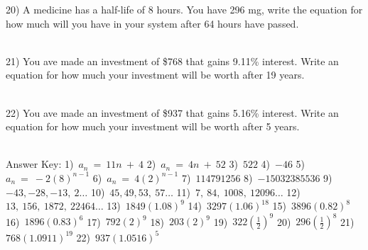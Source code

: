 \documentclass[12pt]{article}
\begin{document}
20) A medicine has a half-life of 8 hours. You have 296 mg, write the equation for how much will you have in your system after 64 hours have passed. \\ \\
 

\hrulefill









21) You ave made an investment of \$768 that gains 9.11\% interest. Write an equation for how much your investment will be worth after 19 years. \\ \\
 

\hrulefill






22) You ave made an investment of \$937 that gains 5.16\% interest. Write an equation for how much your investment will be worth after 5 years. \\ \\
 

\hrulefill


Answer Key: 1)~$a_n~=~11n~+~4$\hspace{.5 in} 2)~$a_n~=~4n~+~52$\hspace{.5 in} 3)~$522$\hspace{.5 in} 4)~$-46$\hspace{.5 in} 5)~$a_n~=~-2(8)^{n-1}$\hspace{.5 in} 6)~$a_n~=~4(2)^{n-1}$\hspace{.5 in} 7)~$114791256$\hspace{.5 in} 8)~$-15032385536$\hspace{.5 in} 9)~$-43, -28, -13,~2\ldots $\hspace{.5 in} 10)~$45, 49, 53,~57\ldots $\hspace{.5 in} 11)~$7,~84,~1008,~12096\ldots $\hspace{.5 in} 12)~$13,~156,~1872,~22464\ldots $\hspace{.5 in} 13)~$1849(1.08)^{9}$\hspace{.5 in} 14)~$3297(1.06)^{18}$\hspace{.5 in} 15)~$3896(0.82)^{8}$\hspace{.5 in} 16)~$1896(0.83)^{6}$\hspace{.5 in} 17)~$792(2)^{9}$\hspace{.5 in} 18)~$203(2)^{9}$\hspace{.5 in} 19)~$322(\frac{1}{2})^{9}$\hspace{.5 in} 20)~$296(\frac{1}{2})^{8}$\hspace{.5 in} 21)~$768(1.0911)^{19}$\hspace{.5 in} 22)~$937(1.0516)^{5}$\hspace{.5 in} 
\end{document}
